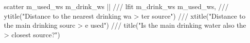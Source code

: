 scatter m_used_ws m_drink_ws  || ///
lfit m_drink_ws m_used_ws, ///
        ytitle("Distance to the nearest drinking wa
> ter source") ///
        xtitle("Distance to the main drinking sourc
> e used") ///
        title("Is the main drinking water also the 
> closest source?")
